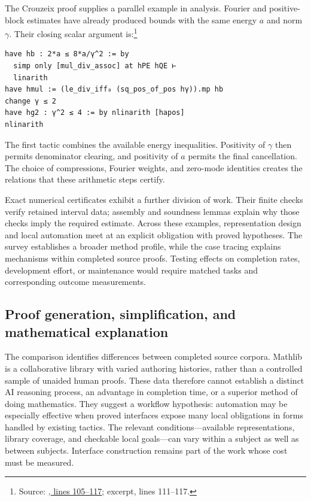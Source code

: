 The Crouzeix proof supplies a parallel example in analysis. Fourier and
positive-block estimates have already produced bounds with the same
energy $a$ and norm $\gamma$. Their closing scalar argument is:\footnote{Source:
\href{https://github.com/openai/math/blob/fd4aeeb2ee4fc729c18d98444fed42fd0529eeeb/lean/OAI/Analysis/DirectCrouzeix/DomainCore.lean\#L105-L117}{, lines 105--117}; excerpt, lines 111--117.}
\begin{lstlisting}[caption={Lean source excerpt: the closing Crouzeix energy calculation.},label={lst:crouzeix-close}]
have hb : 2*a ≤ 8*a/γ^2 := by
  simp only [mul_div_assoc] at hPE hQE ⊢
  linarith
have hmul := (le_div_iff₀ (sq_pos_of_pos hγ)).mp hb
change γ ≤ 2
have hg2 : γ^2 ≤ 4 := by nlinarith [hapos]
nlinarith
\end{lstlisting}
The first tactic combines the available energy inequalities. Positivity
of $\gamma$ then permits denominator clearing, and positivity of $a$
permits the final cancellation. The choice of compressions, Fourier
weights, and zero-mode identities creates the relations that these
arithmetic steps certify.

Exact numerical certificates exhibit a further division of work. Their
finite checks verify retained interval data; assembly and soundness
lemmas explain why those checks imply the required estimate. Across
these examples, representation design and local automation meet at an
explicit obligation with proved hypotheses. The survey establishes a
broader method profile, while the case tracing explains mechanisms
within completed source proofs. Testing effects on completion rates,
development effort, or maintenance would require matched tasks and
corresponding outcome measurements.

\subsection{Proof generation, simplification, and mathematical explanation}
\label{sec:generation-explanation}

The comparison identifies differences between completed source corpora.
Mathlib is a collaborative library with varied authoring histories, rather
than a controlled sample of unaided human proofs. These data therefore
cannot establish a distinct AI reasoning process, an advantage in
completion time, or a superior method of doing mathematics. They suggest
a workflow hypothesis: automation may be especially effective when
proved interfaces expose many local obligations in forms handled by
existing tactics. The relevant conditions---available representations,
library coverage, and checkable local goals---can vary within a subject
as well as between subjects. Interface construction remains part of the
work whose cost must be measured.

